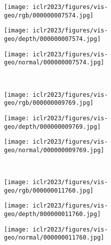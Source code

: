 \documentclass{article} \usepackage{iclr2023_conference,times}
\begin{document}
\begin{figure}
     \centering
     \begin{subfigure}[b]{0.32\textwidth}
         \centering
         \texttt{[image: iclr2023/figures/vis-geo/rgb/000000007574.jpg]}
\label{fig:y equals x}
     \end{subfigure}
     \hfill
     \begin{subfigure}[b]{0.32\textwidth}
         \centering
         \texttt{[image: iclr2023/figures/vis-geo/depth/000000007574.jpg]}
\label{fig:three sin x}
     \end{subfigure}
     \hfill
     \begin{subfigure}[b]{0.32\textwidth}
         \centering
         \texttt{[image: iclr2023/figures/vis-geo/normal/000000007574.jpg]}
\label{fig:five over x}
     \end{subfigure}
     \\
      \begin{subfigure}[b]{0.32\textwidth}
         \centering
         \texttt{[image: iclr2023/figures/vis-geo/rgb/000000009769.jpg]}
\label{fig:y equals x}
     \end{subfigure}
     \hfill
     \begin{subfigure}[b]{0.32\textwidth}
         \centering
         \texttt{[image: iclr2023/figures/vis-geo/depth/000000009769.jpg]}
\label{fig:three sin x}
     \end{subfigure}
     \hfill
     \begin{subfigure}[b]{0.32\textwidth}
         \centering
         \texttt{[image: iclr2023/figures/vis-geo/normal/000000009769.jpg]}
\label{fig:five over x}
     \end{subfigure}
     \\
      \begin{subfigure}[b]{0.32\textwidth}
         \centering
         \texttt{[image: iclr2023/figures/vis-geo/rgb/000000011760.jpg]}
\label{fig:y equals x}
     \end{subfigure}
     \hfill
     \begin{subfigure}[b]{0.32\textwidth}
         \centering
         \texttt{[image: iclr2023/figures/vis-geo/depth/000000011760.jpg]}
\label{fig:three sin x}
     \end{subfigure}
     \hfill
     \begin{subfigure}[b]{0.32\textwidth}
         \centering
         \texttt{[image: iclr2023/figures/vis-geo/normal/000000011760.jpg]}

\end{subfigure}
\end{figure}
\end{document}
